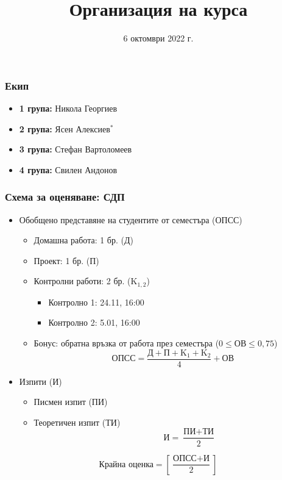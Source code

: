 \documentclass{beamer}
\title{Организация на курса}
\date{6 октомври 2022 г.}
\begin{document}
\begin{frame}
  \titlepage
\end{frame}

\begin{frame}
  \frametitle{Екип}

  \begin{itemize}
  \item \textbf{1 група:} Никола Георгиев
  \item \textbf{2 група:} Ясен Алексиев{\tiny$^*$}
  \item \textbf{3 група:} Стефан Вартоломеев
  \item \textbf{4 група:} Свилен Андонов
  \end{itemize}
\end{frame}

\begin{frame}
  \frametitle{Схема за оценяване: СДП}

  \begin{itemize}
  \item Обобщено представяне на студентите от семестъра (ОПСС)
    \begin{itemize}
    \item Домашна работа: 1 бр. (Д)
    \item Проект: 1 бр. (П)
    \item Контролни работи: 2 бр. (K$_{1,2}$)
      \begin{itemize}
      \item Контролно 1: 24.11, 16:00
      \item Контролно 2: 5.01, 16:00
      \end{itemize}
    \item Бонус: обратна връзка от работа през семестъра ($0 \leq \text{ОВ} \leq 0{,}75$)\\
      \begin{equation*}
        \text{ОПСС} = \frac{\text{Д} + \text{П} + \text{K}_1 + \text{K}_2}4 + \text{ОВ}
      \end{equation*}
    \end{itemize}
  \item Изпити (И)
    \begin{itemize}
    \item Писмен изпит (ПИ)
    \item Теоретичен изпит (ТИ)\\[-7.5ex]
      \begin{equation*}
        \qquad\qquad\text{И} = \frac{\text{ПИ} + \text{ТИ}}2
      \end{equation*}
    \end{itemize}
  \end{itemize}
  \vspace{2ex}
  \begin{equation*}
    \text{Крайна оценка} = \left[ \frac{\text{ОПСС} + \text{И}}2 \right]
  \end{equation*}
\end{frame}
\end{document}
